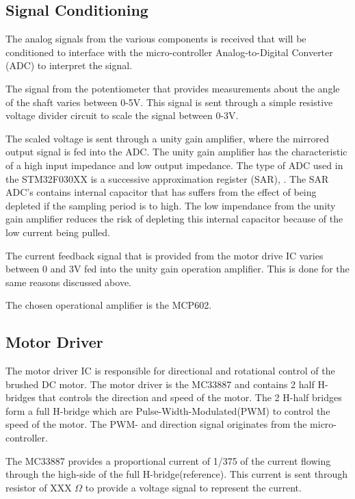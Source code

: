 \documentclass[a4paper,12pt]{article}
\begin{document}
	\subsection{Signal Conditioning}
	
	The analog signals from the various components is received that will be conditioned to interface with the micro-controller Analog-to-Digital Converter (ADC) to interpret the signal.
	
	The signal from the potentiometer that provides measurements about the angle of the shaft varies between 0-5V. This signal is sent through a simple resistive voltage divider circuit to scale the signal between 0-3V. 
	
	The scaled voltage is sent through a unity gain amplifier, where the mirrored output signal is fed into the ADC. The unity gain amplifier has the characteristic of a high input impedance and low output impedance. The type of ADC used in the STM32F030XX is a successive approximation register (SAR), \cite{stm32_ADC:2017}. The SAR ADC's contains internal capacitor that has suffers from the effect of being depleted if the sampling period is to high. The low impendance from the unity gain amplifier reduces the risk of depleting this internal capacitor because of the low current being pulled.
	
	The current feedback signal that is provided from the motor drive IC varies between 0 and 3V fed into the unity gain operation amplifier. This is done for the same reasons discussed above.
	
	The chosen operational amplifier is the MCP602. 
	
	\subsection{Motor Driver}
	
	The motor driver IC is responsible for directional and rotational control of the brushed DC motor. The motor driver is the MC33887 and contains 2 half H-bridges that controls the direction and speed of the motor. The 2 H-half bridges form a full H-bridge which are Pulse-Width-Modulated(PWM) to control the speed of the motor. The PWM- and direction signal originates from the micro-controller. 
	
	The MC33887 provides a proportional current of 1/375 of the current flowing through the high-side of the full H-bridge(reference). This current is sent through resistor of XXX $\Omega$ to provide a voltage signal to represent the current.
	
\end{document}
